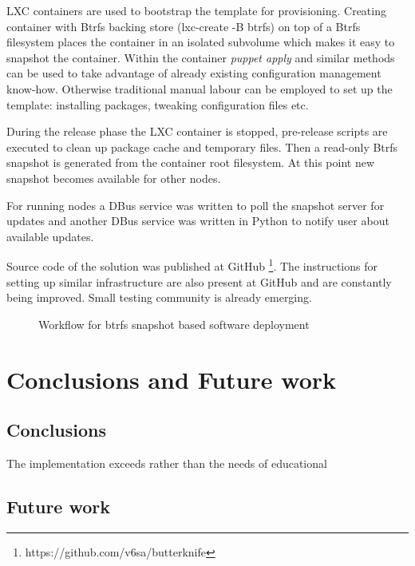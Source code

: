 \documentclass{article}
\begin{document}
LXC containers are used to bootstrap the template for provisioning.
Creating container with Btrfs backing store (lxc-create -B btrfs)
on top of a Btrfs filesystem places the container in an
isolated subvolume which makes it easy to snapshot the container.
Within the container \emph{puppet apply} and similar methods can be used
to take advantage of already existing configuration management know-how.
Otherwise traditional manual labour can be employed to set up the template: installing packages, tweaking configuration files etc.

During the release phase the LXC container is stopped, pre-release
scripts are executed to clean up package cache and temporary files.
Then a read-only Btrfs snapshot is generated from the container root filesystem.
At this point new snapshot becomes available for other nodes.



For running nodes a DBus service was written to poll the snapshot server
for updates and another DBus service was written in Python to notify user
about available updates.

Source code of the solution was published at GitHub
\footnote{https://github.com/v6sa/butterknife}.
The instructions for setting up similar infrastructure
are also present at GitHub and are constantly being improved.
Small testing community is already emerging.

\begin{figure}[!htb]
\centering
\scalebox{0.5}{}
\caption{Workflow for btrfs snapshot based software deployment}
\label{fig:digraph}
\end{figure}




\chapter{Conclusions and Future work}

\section{Conclusions}

The implementation exceeds rather than  the needs of educational 



\section{Future work}
\end{document}
